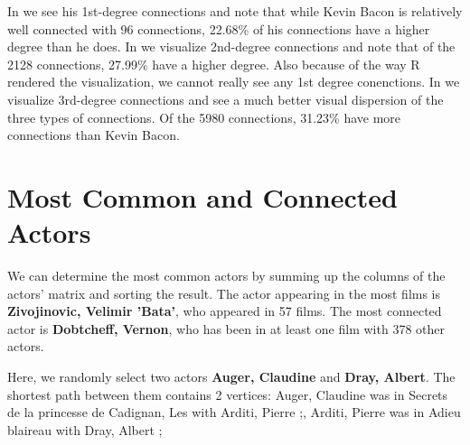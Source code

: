 \documentclass[11pt, fleqn]{article}\usepackage[]{graphicx}\usepackage[]{color}
\begin{document}
In  we see his 1st-degree connections and note that while Kevin Bacon is relatively well connected with 96 connections, 22.68\% of his connections have a higher degree than he does. In  we visualize 2nd-degree connections and note that of the 2128 connections, 27.99\% have a higher degree.  Also because of the way R rendered the visualization, we cannot really see any 1st degree conenctions.  In  we visualize 3rd-degree connections and see a much better visual dispersion of the three types of connections.  Of the 5980 connections, 31.23\% have more connections than Kevin Bacon.  

\section{Most Common and Connected Actors}




We can determine the most common actors by summing up the columns of the actors' matrix and sorting the result. The actor appearing in the most films is \textbf{Zivojinovic, Velimir 'Bata'}, who appeared in 57 films. The most connected actor is \textbf{Dobtcheff, Vernon}, who has been in at least one film with 378 other actors.



Here, we randomly select two actors \textbf{Auger, Claudine} and \textbf{Dray, Albert}. The shortest path between them contains 2 vertices: Auger, Claudine was in Secrets de la princesse de Cadignan, Les with  Arditi, Pierre ;, Arditi, Pierre was in Adieu blaireau with  Dray, Albert ;
\end{document}
